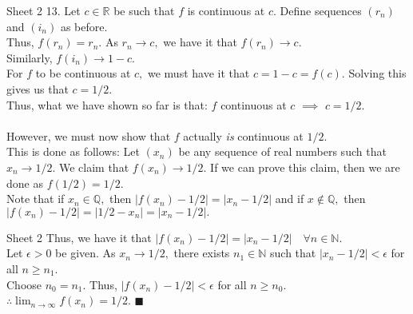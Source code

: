 \documentclass[handout, aspectratio=169]{beamer}
\begin{document}
\begin{frame}{Sheet 2}
	13. Let $c \in \mathbb{R}$ be such that $f$ is continuous at $c.$ Define sequences $(r_n)$ and $(i_n)$ as before.\\
	Thus, $f(r_n) = r_n.$ As $r_n \to c,$ we have it that $f(r_n) \to c.$\\
	Similarly, $f(i_n) \to 1 - c.$\\
	For $f$ to be continuous at $c,$ we must have it that $c = 1 - c = f(c).$ Solving this gives us that $c = 1/2.$\\
	Thus, what we have shown so far is that: $f$ continuous at $c$ $\implies$ $c = 1/2.$\\~\\
	However, we must now show that $f$ actually \emph{is} continuous at $1/2.$\\
	This is done as follows: Let $(x_n)$ be any sequence of real numbers such that $x_n \to 1/2.$ We claim that $f(x_n) \to 1/2.$ If we can prove this claim, then we are done as $f(1/2) = 1/2.$\\
	Note that if $x_n \in \mathbb{Q},$ then $|f(x_n) - 1/2| = |x_n - 1/2|$ and if $x \not\in\mathbb{Q},$ then $|f(x_n) - 1/2| = |1/2 - x_n| = |x_n - 1/2|.$
\end{frame}
\begin{frame}{Sheet 2}
	Thus, we have it that $|f(x_n) - 1/2| = |x_n - 1/2| \quad \forall n \in \mathbb{N}.$\\
	Let $\epsilon > 0$ be given. As $x_n \to 1/2,$ there exists $n_1 \in \mathbb{N}$ such that $|x_n - 1/2| < \epsilon$ for all $n \ge n_1.$\\
	Choose $n_0 = n_1.$ Thus, $|f(x_n) - 1/2| < \epsilon$ for all $n \ge n_0.$\\
	$\therefore \displaystyle\lim_{n\to \infty}f(x_n) = 1/2.$ \hfill $\blacksquare$
\end{frame}
\end{document}
